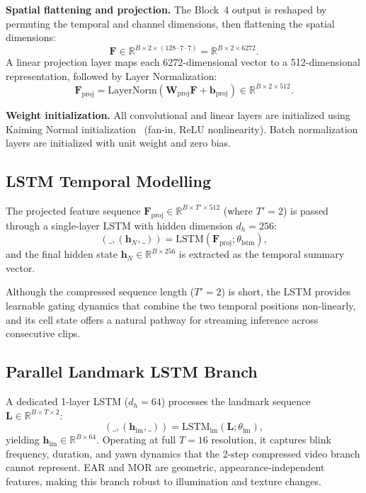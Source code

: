 \documentclass[journal]{IEEEtran}
\begin{document}
\textbf{Spatial flattening and projection.} The Block~4 output is reshaped by permuting the temporal and channel dimensions, then flattening the spatial dimensions:
\begin{equation}
\mathbf{F} \in \mathbb{R}^{B \times 2 \times (128 \cdot 7 \cdot 7)} = \mathbb{R}^{B \times 2 \times 6272}.
\end{equation}
A linear projection layer maps each 6272-dimensional vector to a 512-dimensional representation, followed by Layer Normalization:
\begin{equation}
\mathbf{F}_{\text{proj}} = \text{LayerNorm}(\mathbf{W}_{\text{proj}}\mathbf{F} + \mathbf{b}_{\text{proj}}) \in \mathbb{R}^{B \times 2 \times 512}.
\end{equation}

\textbf{Weight initialization.} All convolutional and linear layers are initialized using Kaiming Normal initialization~\cite{he2015} (fan-in, ReLU nonlinearity). Batch normalization layers are initialized with unit weight and zero bias.

\subsection{LSTM Temporal Modelling}
\label{sec:lstm}

The projected feature sequence $\mathbf{F}_{\text{proj}} \in \mathbb{R}^{B \times T' \times 512}$ (where $T'{=}2$) is passed through a single-layer LSTM with hidden dimension $d_h = 256$:
\begin{equation}
(\_, (\mathbf{h}_N, \_)) = \text{LSTM}(\mathbf{F}_{\text{proj}}; \theta_{\text{lstm}}),
\end{equation}
and the final hidden state $\mathbf{h}_N \in \mathbb{R}^{B \times 256}$ is extracted as the temporal summary vector.

Although the compressed sequence length ($T'{=}2$) is short, the LSTM provides learnable gating dynamics that combine the two temporal positions non-linearly, and its cell state offers a natural pathway for streaming inference across consecutive clips.

\subsection{Parallel Landmark LSTM Branch}
\label{sec:landmark_branch}

A dedicated 1-layer LSTM ($d_h{=}64$) processes the landmark sequence $\mathbf{L} \in \mathbb{R}^{B \times T \times 2}$:
\begin{equation}
(\_, (\mathbf{h}_{\text{lm}}, \_)) = \text{LSTM}_{\text{lm}}(\mathbf{L}; \theta_{\text{lm}}),
\end{equation}
yielding $\mathbf{h}_{\text{lm}} \in \mathbb{R}^{B \times 64}$. Operating at full $T{=}16$ resolution, it captures blink frequency, duration, and yawn dynamics that the 2-step compressed video branch cannot represent. EAR and MOR are geometric, appearance-independent features, making this branch robust to illumination and texture changes.
\end{document}
